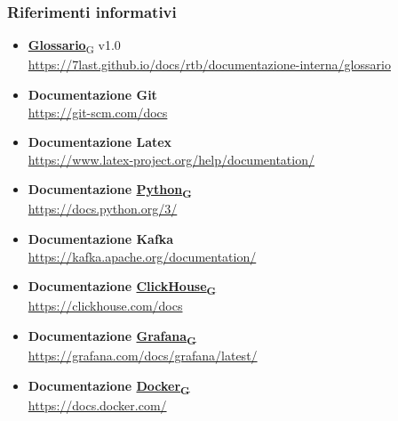 \subsubsection{Riferimenti informativi}
\begin{itemize}
    \item\href{https://7last.github.io/docs/rtb/documentazione-interna/glossario\#glossario}{\textbf{Glossario}\textsubscript{G}} v1.0\\ \url{https://7last.github.io/docs/rtb/documentazione-interna/glossario}
    \item\textbf{Documentazione Git}\\ \url{https://git-scm.com/docs}
    \item\textbf{Documentazione Latex}\\ \url{https://www.latex-project.org/help/documentation/}
    \item\textbf{Documentazione \href{https://7last.github.io/docs/rtb/documentazione-interna/glossario\#python}{Python\textsubscript{G}}}\\ \url{https://docs.python.org/3/}
    \item\textbf{Documentazione Kafka}\\ \url{https://kafka.apache.org/documentation/}
    \item\textbf{Documentazione \href{https://7last.github.io/docs/rtb/documentazione-interna/glossario\#clickhouse}{ClickHouse\textsubscript{G}}}\\ \url{https://clickhouse.com/docs}
    \item\textbf{Documentazione \href{https://7last.github.io/docs/rtb/documentazione-interna/glossario\#grafana}{Grafana\textsubscript{G}}}\\ \url{https://grafana.com/docs/grafana/latest/}
    \item\textbf{Documentazione \href{https://7last.github.io/docs/rtb/documentazione-interna/glossario\#docker}{Docker\textsubscript{G}}}\\ \url{https://docs.docker.com/}
\end{itemize}